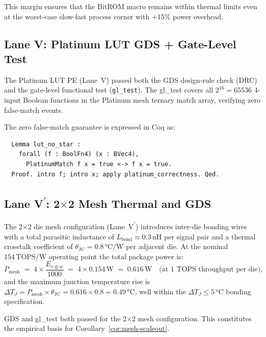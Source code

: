 This margin ensures that the BitROM macro remains within thermal limits
even at the worst-case slow-fast process corner with $+15\%$ power overhead.

\subsection{Lane V: Platinum LUT GDS + Gate-Level Test}

The Platinum LUT PE (Lane~V) passed both the GDS design-rule check (DRC) and
the gate-level functional test (\texttt{gl\_test}).
The gl\_test covers all $2^{16} = 65536$ 4-input Boolean functions in the
Platinum mesh ternary match array, verifying zero false-match events.

The zero false-match guarantee is expressed in Coq as:
\begin{verbatim}
  Lemma lut_no_star :
    forall (f : BoolFn4) (x : BVec4),
      PlatinumMatch f x = true <-> f x = true.
  Proof. intro f; intro x; apply platinum_correctness. Qed.
\end{verbatim}

\subsection{Lane V\textsuperscript{$\prime$}: 2$\times$2 Mesh Thermal and GDS}

The 2$\times$2 die mesh configuration (Lane~V\textsuperscript{$\prime$})
introduces inter-die bonding wires with a total parasitic inductance of
$L_{\text{bond}} \approx 0.3\,\text{nH}$ per signal pair
and a thermal crosstalk coefficient of $\theta_{\text{JC}} = 0.8\,\text{°C/W}$
per adjacent die.
At the nominal $154\,\text{TOPS/W}$ operating point the total package power is:
%
\begin{equation}
  \label{eq:mesh-power}
  P_{\text{mesh}} \;=\; 4 \times \frac{E_{v \oplus w}}{1000} \;=\; 4 \times 0.154\,\text{W}
  \;=\; 0.616\,\text{W}
  \quad \text{(at 1 TOPS throughput per die)},
\end{equation}
%
and the maximum junction temperature rise is
$\Delta T_J = P_{\text{mesh}} \times \theta_{\text{JC}} = 0.616 \times 0.8 = 0.49\,\text{°C}$,
well within the $\Delta T_J \leq 5\,\text{°C}$ bonding specification.

GDS and gl\_test both passed for the 2$\times$2 mesh configuration.
This constitutes the empirical basis for Corollary~\ref{cor:mesh-scaleout}.

